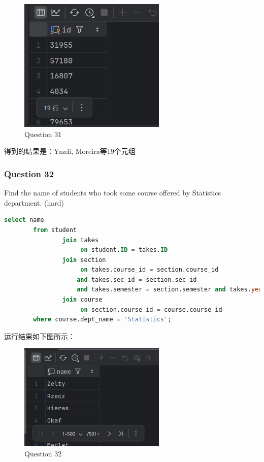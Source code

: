 \documentclass{article}
\begin{document}
    \begin{figure}[H]
    	\centering
    	\includegraphics[width=7cm]{./images/35.Question31.png}
    	\caption{Question 31}
    \end{figure}
    
    得到的结果是：Yazdi, Moreira等19个元组
    
    \subsubsection{Question 32}
    
    Find the name of students who took some course offered by Statistics department.  (hard)
    
    \begin{lstlisting}[language=sql, title=Question 32, tabsize=4]
    	select name
    	from student
    			join takes
    				 on student.ID = takes.ID
    			join section
    				 on takes.course_id = section.course_id 
    				and takes.sec_id = section.sec_id 
    				and takes.semester = section.semester and takes.year = section.year
    			join course
    			 	 on section.course_id = course.course_id
    	where course.dept_name = 'Statistics';
    \end{lstlisting}
    
    运行结果如下图所示：
    
    \begin{figure}[H]
    	\centering
    	\includegraphics[width=7cm]{./images/36.Question32.png}
    	\caption{Question 32}
    \end{figure}
    
\end{document}
